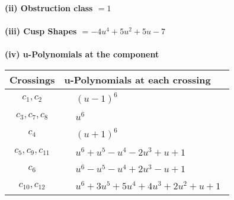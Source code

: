 \documentclass[1p]{elsarticle_modified}
\theoremstyle{definition}
\begin{document}
\flushleft \textbf{(ii) Obstruction class $= 1$}\\~\\
\flushleft \textbf{(iii) Cusp Shapes $= -4 u^4+5 u^2+5 u-7$}\\~\\
\newpage\renewcommand{\arraystretch}{1}
\flushleft \textbf{(iv) u-Polynomials at the component}\newline \\
\begin{tabular}{m{50pt}|m{274pt}}
Crossings & \hspace{64pt}u-Polynomials at each crossing \\
\hline $$\begin{aligned}c_{1},c_{2}\end{aligned}$$&$\begin{aligned}
&(u-1)^6
\end{aligned}$\\
\hline $$\begin{aligned}c_{3},c_{7},c_{8}\end{aligned}$$&$\begin{aligned}
&u^6
\end{aligned}$\\
\hline $$\begin{aligned}c_{4}\end{aligned}$$&$\begin{aligned}
&(u+1)^6
\end{aligned}$\\
\hline $$\begin{aligned}c_{5},c_{9},c_{11}\end{aligned}$$&$\begin{aligned}
&u^6+u^5- u^4-2 u^3+u+1
\end{aligned}$\\
\hline $$\begin{aligned}c_{6}\end{aligned}$$&$\begin{aligned}
&u^6- u^5- u^4+2 u^3- u+1
\end{aligned}$\\
\hline $$\begin{aligned}c_{10},c_{12}\end{aligned}$$&$\begin{aligned}
&u^6+3 u^5+5 u^4+4 u^3+2 u^2+u+1
\end{aligned}$\\
\hline
\end{tabular}\\~\\
\end{document}
